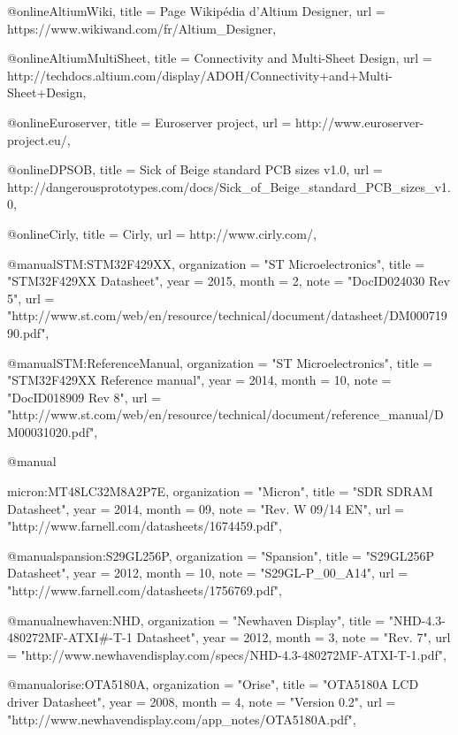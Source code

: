 @online{AltiumWiki,
	title = {Page Wikipédia d'Altium Designer},
	url = {https://www.wikiwand.com/fr/Altium_Designer},
}

@online{AltiumMultiSheet,
	title = {Connectivity and Multi-Sheet Design},
	url = {http://techdocs.altium.com/display/ADOH/Connectivity+and+Multi-Sheet+Design},
}

@online{Euroserver,
	title = {Euroserver project},
	url = {http://www.euroserver-project.eu/},
}


@online{DPSOB,
	title = {Sick of Beige standard PCB sizes v1.0},
	url = {http://dangerousprototypes.com/docs/Sick_of_Beige_standard_PCB_sizes_v1.0},
}

@online{Cirly,
	title = {Cirly},
	url = {http://www.cirly.com/},
}

@manual{STM:STM32F429XX,
	organization  = "ST Microelectronics",
	title         = "STM32F429XX Datasheet",
	year          =  2015,
	month         =  2,    
	note          = "DocID024030 Rev 5",
	url           = "http://www.st.com/web/en/resource/technical/document/datasheet/DM00071990.pdf", 
}
	
@manual{STM:ReferenceManual,
	organization  = "ST Microelectronics",
	title         = "STM32F429XX Reference manual",
	year          =  2014,
	month         =  10,    
	note          = "DocID018909 Rev 8",
	url           = "http://www.st.com/web/en/resource/technical/document/reference_manual/DM00031020.pdf",    
}

@manual{micron:MT48LC32M8A2P7E,
	organization  = "Micron",
	title         = "SDR SDRAM Datasheet",
	year          =  2014,
	month         =  09,    
	note          = "Rev. W 09/14 EN",
	url           = "http://www.farnell.com/datasheets/1674459.pdf",
	    
}

@manual{spansion:S29GL256P,
	organization  = "Spansion",
	title         = "S29GL256P Datasheet",
	year          =  2012,
	month         =  10,    
	note          = "S29GL-P\_00\_A14",
	url           = "http://www.farnell.com/datasheets/1756769.pdf",
}

@manual{newhaven:NHD,
	organization  = "Newhaven Display",
	title         = "NHD-4.3-480272MF-ATXI\#-T-1 Datasheet",
	year          =  2012,
	month         =  3,    
	note          = "Rev. 7",
	url           = "http://www.newhavendisplay.com/specs/NHD-4.3-480272MF-ATXI-T-1.pdf",
}

@manual{orise:OTA5180A,
	organization  = "Orise",
	title         = "OTA5180A LCD driver Datasheet",
	year          =  2008,
	month         =  4,    
	note          = "Version 0.2",
	url           = "http://www.newhavendisplay.com/app_notes/OTA5180A.pdf",
}


